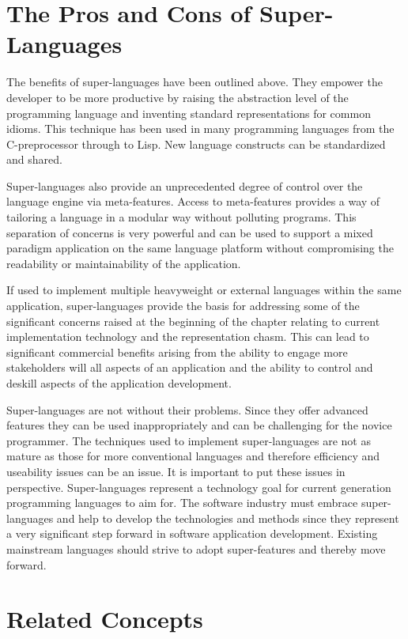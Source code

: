 \section{The Pros and Cons of Super-Languages}

The benefits of super-languages have been outlined above. They empower
the developer to be more productive by raising the abstraction level
of the programming language and inventing standard representations
for common idioms. This technique has been used in many programming
languages from the C-preprocessor through to Lisp. New language constructs
can be standardized and shared.

Super-languages also provide an unprecedented degree of control over
the language engine via meta-features. Access to meta-features provides
a way of tailoring a language in a modular way without polluting programs.
This separation of concerns is very powerful and can be used to support
a mixed paradigm application on the same language platform without
compromising the readability or maintainability of the application.

If used to implement multiple heavyweight or external languages within
the same application, super-languages provide the basis for addressing
some of the significant concerns raised at the beginning of the chapter
relating to current implementation technology and the representation
chasm. This can lead to significant commercial benefits arising from
the ability to engage more stakeholders will all aspects of an application
and the ability to control and deskill aspects of the application
development.

Super-languages are not without their problems. Since they offer advanced
features they can be used inappropriately and can be challenging for
the novice programmer. The techniques used to implement super-languages
are not as mature as those for more conventional languages and therefore
efficiency and useability issues can be an issue. It is important
to put these issues in perspective. Super-languages represent a technology
goal for current generation programming languages to aim for. The
software industry must embrace super-languages and help to develop
the technologies and methods since they represent a very significant
step forward in software application development. Existing mainstream
languages should strive to adopt super-features and thereby move forward.


\section{Related Concepts}

